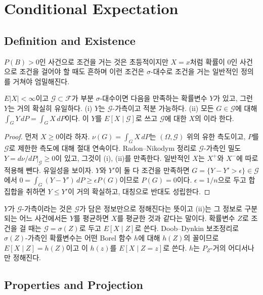 \section{Conditional Expectation}
\label{sec:conditional-expectation}

\subsection{Definition and Existence}

$P(B)>0$인 사건으로 조건을 거는 것은 초등적이지만 $X=x$처럼 확률이 $0$인 사건으로 조건을 걸어야 할 때도 흔하며 이런 조건은 $\sigma$-대수로 조건을 거는 일반적인 정의를 거쳐야 엄밀해진다.

\begin{theorem}
\label{thm:conditional-expectation}
$E|X|<\infty$이고 $\mathcal G\subset\mathcal F$가 부분 $\sigma$-대수이면 다음을 만족하는 확률변수 $Y$가 있고, 그런 $Y$는 거의 확실히 유일하다.
(i) $Y$는 $\mathcal G$-가측이고 적분 가능하다.
(ii) 모든 $G\in\mathcal G$에 대해 $\int_GY\,dP=\int_GX\,dP$이다.
이 $Y$를 $E[X\mid\mathcal G]$로 쓰고 $\mathcal G$에 대한 $X$의 이라 한다.
\end{theorem}

\begin{proof}
먼저 $X\ge0$이라 하자. $\nu(G)=\int_GX\,dP$는 $(\Omega,\mathcal G)$ 위의 유한 측도이고, $P$를 $\mathcal G$로 제한한 측도에 대해 절대 연속이다. Radon--Nikodym 정리로 $\mathcal G$-가측인 밀도 $Y=d\nu/dP|_{\mathcal G}\ge0$이 있고, 그것이 (i), (ii)를 만족한다. 일반적인 $X$는 $X^+$와 $X^-$에 따로 적용해 뺀다. 유일성을 보이자. $Y$와 $Y'$이 둘 다 조건을 만족하면 $G=\{Y-Y'>\epsilon\}\in\mathcal G$에서 $0=\int_G(Y-Y')\,dP\ge\epsilon P(G)$이므로 $P(G)=0$이다. $\epsilon=1/n$으로 두고 합집합을 취하면 $Y\le Y'$이 거의 확실하고, 대칭으로 반대도 성립한다.
\end{proof}

$Y$가 $\mathcal G$-가측이라는 것은 $\mathcal G$가 담은 정보만으로 정해진다는 뜻이고 (ii)는 그 정보로 구분되는 어느 사건에서든 $Y$를 평균하면 $X$를 평균한 것과 같다는 말이다. 확률변수 $Z$로 조건을 걸 때는 $\mathcal G=\sigma(Z)$로 두고 $E[X\mid Z]$로 쓴다. Doob--Dynkin 보조정리로 $\sigma(Z)$-가측인 확률변수는 어떤 Borel 함수 $h$에 대해 $h(Z)$의 꼴이므로 $E[X\mid Z]=h(Z)$이고 이 $h(z)$를 $E[X\mid Z=z]$로 쓴다. $h$는 $P_Z$-거의 어디서나만 정해진다.

\subsection{Properties and Projection}

